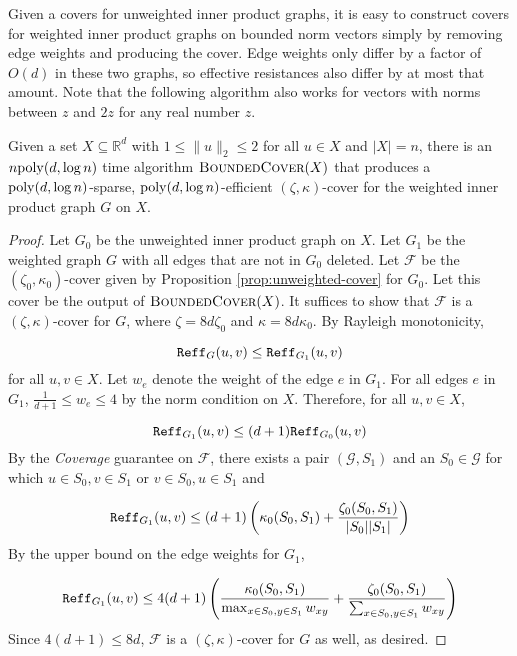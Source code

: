 Given a covers for unweighted inner product graphs, it is easy to construct covers for weighted inner product graphs on bounded norm vectors simply by removing edge weights and producing the cover. Edge weights only differ by a factor of $O(d)$ in these two graphs, so effective resistances also differ by at most that amount. Note that the following algorithm also works for vectors with norms between $z$ and $2z$ for any real number $z$.

\begin{proposition}\label{prop:bounded-cover}
Given a set $X\subseteq \mathbb{R}^d$ with $1\le \|u\|_2\le 2$ for all $u\in X$ and $|X| = n$, there is an $n\mathrm{poly}(d,\log n)$ time algorithm $\textsc{BoundedCover}(X)$ that produces a $\mathrm{poly}(d,\log n)$-sparse, $\mathrm{poly}(d,\log n)$-efficient $(\zeta,\kappa)$-cover for the weighted inner product graph $G$ on $X$.
\end{proposition}

\begin{proof}
Let $G_0$ be the unweighted inner product graph on $X$. Let $G_1$ be the weighted graph $G$ with all edges that are not in $G_0$ deleted. Let $\mathcal F$ be the $(\zeta_0,\kappa_0)$-cover given by Proposition \ref{prop:unweighted-cover} for $G_0$. Let this cover be the output of $\textsc{BoundedCover}(X)$. It suffices to show that $\mathcal F$ is a $(\zeta,\kappa)$-cover for $G$, where $\zeta = 8d \zeta_0$ and $\kappa = 8d \kappa_0$. By Rayleigh monotonicity,

$$\mathtt{Reff}_G(u,v)\le \mathtt{Reff}_{G_1}(u,v)$$
for all $u,v\in X$. Let $w_e$ denote the weight of the edge $e$ in $G_1$. For all edges $e$ in $G_1$, $\frac{1}{d+1}\le w_e\le 4$ by the norm condition on $X$. Therefore, for all $u,v\in X$,

$$\mathtt{Reff}_{G_1}(u,v)\le (d+1)\mathtt{Reff}_{G_0}(u,v)$$
By the \emph{Coverage} guarantee on $\mathcal F$, there exists a pair $(\mathcal G,S_1)$ and an $S_0\in \mathcal G$ for which $u\in S_0,v\in S_1$ or $v\in S_0,u\in S_1$ and

$$\mathtt{Reff}_{G_1}(u,v)\le (d+1) \left(\kappa_0(S_0,S_1) + \frac{\zeta_0(S_0,S_1)}{|S_0||S_1|}\right)$$
By the upper bound on the edge weights for $G_1$,

$$\mathtt{Reff}_{G_1}(u,v)\le 4(d+1) \left(\frac{\kappa_0(S_0,S_1)}{\max_{x\in S_0,y\in S_1} w_{xy}} + \frac{\zeta_0(S_0,S_1)}{\sum_{x\in S_0,y\in S_1}w_{xy}}\right)$$
Since $4(d+1)\le 8d$, $\mathcal F$ is a $(\zeta,\kappa)$-cover for $G$ as well, as desired.
\end{proof}

